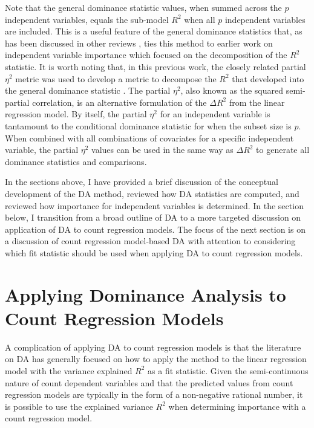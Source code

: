 \documentclass[man]{apa7}
\begin{document}
	Note that the general dominance statistic values, when summed across the $p$ independent variables, equals the sub-model $R^2$ when all $p$ independent variables are included.
	This is a useful feature of the general dominance statistics that, as has been discussed in other reviews \parencite{gromping2007estimators,johnson2004history}, ties this method to earlier work on independent variable importance which focused on the decomposition of the $R^2$ statistic.
	It is worth noting that, in this previous work, the closely related partial $\eta^2$ metric was used to develop a metric to decompose the $R^2$ that developed into the general dominance statistic \parencite[see][]{lindeman1980introduction,budescu1993dominance}.
	The partial $\eta^2$, also known as the squared semi-partial correlation, is an alternative formulation of the $\Delta R^2$ from the linear regression model.
	By itself, the partial $\eta^2$ for an independent variable is tantamount to the conditional dominance statistic for when the subset size is $p$.
	When combined with all combinations of covariates for a specific independent variable, the partial $\eta^2$ values can be used in the same way as $\Delta R^2$ to generate all dominance statistics and comparisons.

	In the sections above, I have provided a brief discussion of the conceptual development of the DA method, reviewed how DA statistics are computed, and reviewed how importance for independent variables is determined.
	In the section below, I transition from a broad outline of DA to a more targeted discussion on application of DA to count regression models.
	The focus of the next section is on a discussion of count regression model-based DA with attention to considering which fit statistic should be used when applying DA to count regression models.
	
\section{Applying Dominance Analysis to Count Regression Models}

	A complication of applying DA to count regression models is that the literature on DA has generally focused on how to apply the method to the linear regression model with the variance explained $R^2$ as a fit statistic.
	Given the semi-continuous nature of count dependent variables and that the predicted values from count regression models are typically in the form of a non-negative rational number, it is possible to use the explained variance $R^2$ when determining importance with a count regression model.
	
\end{document}
